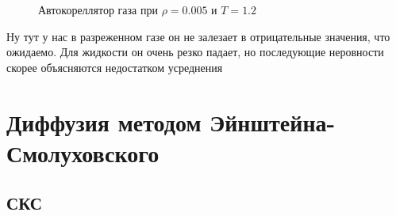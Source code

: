 \documentclass[a4paper]{article}
\begin{document}
\begin{figure}[h]
\begin{center}
\begin{minipage}[h]{0.45\linewidth}
\begin{center}
\caption{Автокореллятор газа при $\rho= 0.005$ и $T = 1.2$}
\end{center}
\end{minipage}
\end{center}
\end{figure}
Ну тут у нас в разреженном газе он не залезает в отрицательные значения, что ожидаемо. Для жидкости он очень резко падает, но последующие неровности скорее объясняются недостатком усреднения


\section{Диффузия методом Эйнштейна-Смолуховского} %
\label{sec:диффузия_методом_эйнштейна_смолуховского}
\subsection*{СКС}
\end{document}

